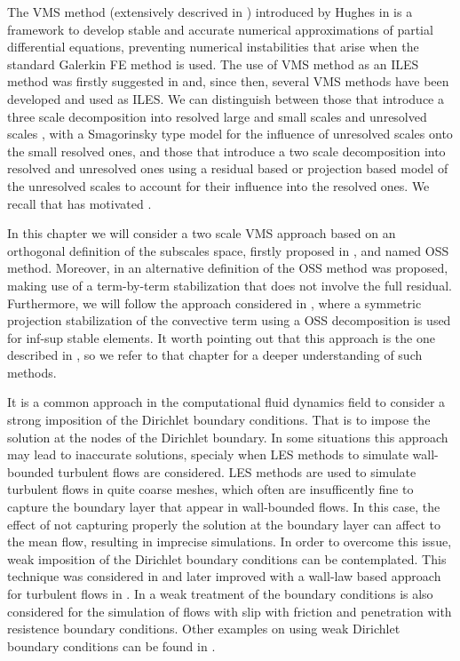 The VMS method (extensively descrived in ) introduced by Hughes in \cite{hughes_multiscale_1995,hughes_variational_1998} is a framework to develop stable and accurate numerical approximations of partial differential equations, preventing numerical instabilities that arise when the standard Galerkin FE method is used. The use of VMS method as an ILES method was firstly suggested in \cite{hughes_multiscale_2001,hughes_large_2001,codina_stabilized_2002} and, since then, several VMS methods have been developed and used as ILES. We can distinguish between those that introduce a three scale decomposition into resolved large and small scales and unresolved scales \cite{koobus_variational_2004,john_variants_2008, john_numerical_2010, masud_variational_2011}, with a Smagorinsky type model for the influence of unresolved scales onto the small resolved ones, and those that introduce a two scale decomposition into resolved and unresolved ones \cite{bazilevs_variational_2007,colomes_assessment_2015} using a residual based or projection based model of the unresolved scales to account for their influence into the resolved ones. We recall that \cite{colomes_assessment_2015} has motivated .

In this chapter we will consider a two scale VMS approach based on an orthogonal definition of the subscales space, firstly proposed in \cite{codina_stabilization_2000}, and named OSS method. Moreover, in \cite{codina_analysis_2008} an alternative definition of the OSS method was proposed, making use of a term-by-term stabilization that does not involve the full residual. Furthermore, we will follow the approach considered in \cite{colomes_mixed_2015}, where a symmetric projection stabilization of the convective term using a OSS decomposition is used for inf-sup stable elements. It worth pointing out that this approach is the one described in , so we refer to that chapter for a deeper understanding of such methods.

It is a common approach in the computational fluid dynamics field to consider a strong imposition of the Dirichlet boundary conditions. That is to impose the solution at the nodes of the Dirichlet boundary. In some situations this approach may lead to inaccurate solutions, specialy when LES methods to simulate wall-bounded turbulent flows are considered. LES methods are used to simulate turbulent flows in quite coarse meshes, which often are insufficently fine to capture the boundary layer that appear in wall-bounded flows. In this case, the effect of not capturing properly the solution at the boundary layer can affect to the mean flow, resulting in imprecise simulations. In order to overcome this issue, weak imposition of the Dirichlet boundary conditions can be contemplated. This technique was considered in \cite{bazilevs_weak_2007-1} and later improved with a wall-law based approach for turbulent flows in \cite{bazilevs_weak_2007}. In \cite{john_slip_2002} a weak treatment of the boundary conditions is also considered for the simulation of flows with slip with friction and penetration with resistence boundary conditions. Other examples on using weak Dirichlet boundary conditions can be found in \cite{davidson_lesfoil:_2000}.


